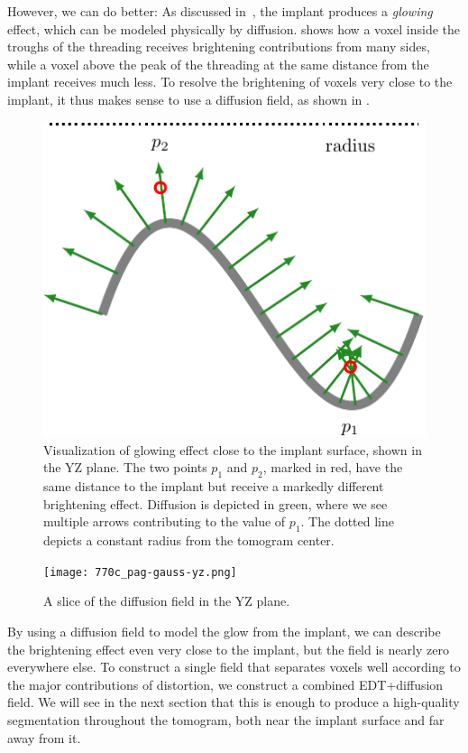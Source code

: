 However, we can do better: As discussed in~, the implant
produces a \textit{glowing} effect, which can be modeled physically by
diffusion.  shows how a voxel inside the troughs of
the threading receives brightening contributions from many sides, while a voxel
above the peak of the threading at the same distance from the implant receives
much less. To resolve the brightening of voxels very close to the implant, it
thus makes sense to use a diffusion field, as shown in .

\begin{figure}
    \centering
    \includegraphics{glowing-crop}
    \caption{Visualization of glowing effect close to the implant surface,
        shown in the YZ plane. The two points $p_1$ and $p_2$, marked in red, have
        the same distance to the implant but receive a markedly different
        brightening effect. Diffusion is depicted in green, where we see multiple
        arrows contributing to the value of $p_1$. The dotted line depicts a
        constant radius from the tomogram center.}
    \label{fig:edt-vs-diffusion}
\end{figure}


\begin{figure}
    \texttt{[image: 770c\_pag-gauss-yz.png]}
    \caption{A slice of the diffusion field in the YZ plane.}
    \label{fig:field-slice}
\end{figure}

By using a diffusion field to model the glow from the implant, we can describe
the brightening effect even very close to the implant, but the field is nearly
zero everywhere else. To construct a single field that separates voxels well
according to the major contributions of distortion, we construct a combined
EDT+diffusion field. We will see in the next section that this is enough to
produce a high-quality segmentation throughout the tomogram, both near the
implant surface and far away from it.

